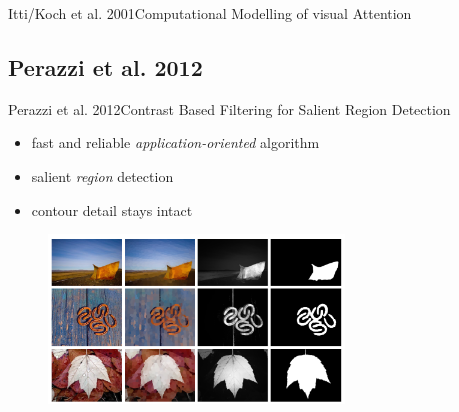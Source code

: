 \documentclass[compress,t]{beamer}
\begin{document}
\begin{frame}{Itti/Koch et al. 2001}{Computational Modelling of visual Attention}
\begin{figure}
{
            \label{fig:difference-of-gaussians}
        }
        \hspace{5mm}
    \end{figure}
\end{frame}

\subsection{Perazzi et al. 2012}
\begin{frame}{Perazzi et al. 2012}{Contrast Based Filtering for Salient Region Detection}
    \begin{itemize}
        \item fast and reliable \emph{application-oriented} algorithm
        \item salient \emph{region} detection
        \item contour detail stays intact
    \end{itemize}

    \centering
    \begin{figure}
        \includegraphics[width=0.7\textwidth]{graphics/example-maps-2.png}
        \label{fig:example-maps-2}
    \end{figure}
\end{frame}
\end{document}
